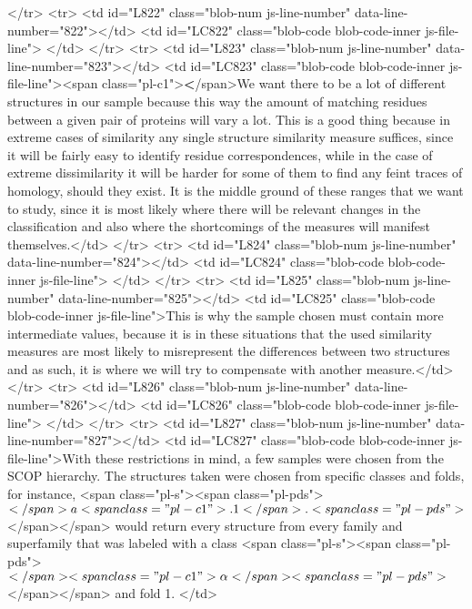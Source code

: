       </tr>
      <tr>
        <td id="L822" class="blob-num js-line-number" data-line-number="822"></td>
        <td id="LC822" class="blob-code blob-code-inner js-file-line">
</td>
      </tr>
      <tr>
        <td id="L823" class="blob-num js-line-number" data-line-number="823"></td>
        <td id="LC823" class="blob-code blob-code-inner js-file-line"><span class="pl-c1">\textbf</span>{We want there to be a lot of different structures in our sample because this way the amount of matching residues between a given pair of proteins will vary a lot. This is a good thing because in extreme cases of similarity any single structure similarity measure suffices, since it will be fairly easy to identify residue correspondences, while in the case of extreme dissimilarity it will be harder for some of them to find any feint traces of homology, should they exist.} It is the middle ground of these ranges that we want to study, since it is most likely where there will be relevant changes in the classification and also where the shortcomings of the measures will manifest themselves.</td>
      </tr>
      <tr>
        <td id="L824" class="blob-num js-line-number" data-line-number="824"></td>
        <td id="LC824" class="blob-code blob-code-inner js-file-line">
</td>
      </tr>
      <tr>
        <td id="L825" class="blob-num js-line-number" data-line-number="825"></td>
        <td id="LC825" class="blob-code blob-code-inner js-file-line">This is why the sample chosen must contain more intermediate values, because it is in these situations that the used similarity measures are most likely to misrepresent the differences between two structures and as such, it is where we will try to compensate with another measure.</td>
      </tr>
      <tr>
        <td id="L826" class="blob-num js-line-number" data-line-number="826"></td>
        <td id="LC826" class="blob-code blob-code-inner js-file-line">
</td>
      </tr>
      <tr>
        <td id="L827" class="blob-num js-line-number" data-line-number="827"></td>
        <td id="LC827" class="blob-code blob-code-inner js-file-line">With these restrictions in mind, a few samples were chosen from the SCOP hierarchy. The structures taken were chosen from specific classes and folds, for instance, <span class="pl-s"><span class="pl-pds">$</span>a<span class="pl-c1">.1</span>.<span class="pl-pds">$</span></span> would return every structure from every family and superfamily that was labeled with a class <span class="pl-s"><span class="pl-pds">$</span><span class="pl-c1">\alpha</span><span class="pl-pds">$</span></span> and fold 1. </td>
